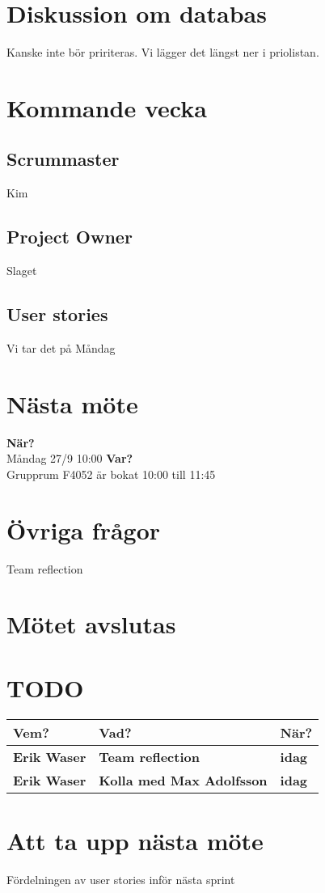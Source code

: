 \documentclass[9pt]{article}
\newcommand{\Waser}{Erik Waser\xspace}
\newcommand{\Max}{Max Adolfsson\xspace}
\begin{document}
\section{Diskussion om databas}
Kanske inte bör pririteras. Vi lägger det längst ner i priolistan. 

\section{Kommande vecka}
\subsection{Scrummaster} Kim
\subsection{Project Owner} Slaget
\subsection{User stories} Vi tar det på Måndag 


\section{Nästa möte}
\textbf{När?} \\ Måndag 27/9 10:00
\textbf{Var?} \\ Grupprum F4052 är bokat 10:00 till 11:45

\section{Övriga frågor}
Team reflection 
\section{Mötet avslutas}


\appendix
\section{TODO}
\begin{tabular}{| p{3cm} | p{7.5cm} | p{3cm}|}
  \hline
  \textbf{Vem?} & \textbf{Vad?} & \textbf{När?} \\ \hline
  \textbf{\Waser} & \textbf{Team reflection} & \textbf{idag} \\ \hline
  \textbf{\Waser} & \textbf{Kolla med \Max} & \textbf{idag} \\ \hline


  \end{tabular}
\section{Att ta upp nästa möte}
Fördelningen av user stories inför nästa sprint 
\end{document}
